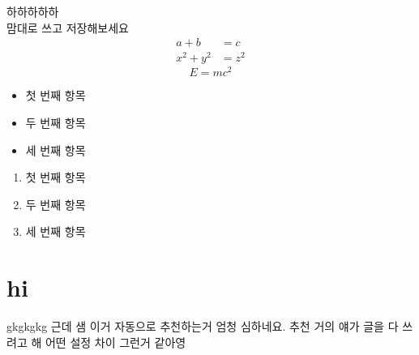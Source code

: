 \documentclass{article}
\begin{document}
하하하하하 \\
맘대로 쓰고 저장해보세요
\begin{align*}
    a + b &= c \\
    x^2 + y^2 &= z^2
\end{align*}
\begin{equation}
    E = mc^2
\end{equation}
\begin{itemize}
    \item 첫 번째 항목
    \item 두 번째 항목
    \item 세 번째 항목
\end{itemize}
\begin{enumerate}
    \item 첫 번째 항목
    \item 두 번째 항목
    \item 세 번째 항목
\end{enumerate}
\section{hi}
gkgkgkg
근데 샘 이거 자동으로 추천하는거 엄청 심하네요. 추천
거의 얘가 글을 다 쓰려고 해 어떤 설정 차이 그런거 같아영
\end{document}
